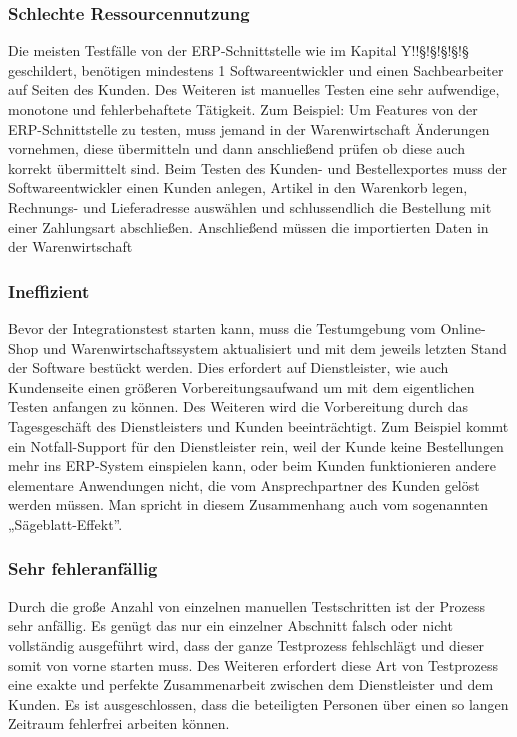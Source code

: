 \subsubsection{Schlechte Ressourcennutzung}%
Die meisten Testfälle von der ERP-Schnittstelle wie im Kapital Y!!§!§!§!§!§ geschildert, benötigen mindestens 1 Softwareentwickler und einen Sachbearbeiter auf Seiten des Kunden. Des Weiteren ist manuelles Testen eine sehr aufwendige, monotone und fehlerbehaftete
Tätigkeit. Zum Beispiel: Um Features von der ERP-Schnittstelle zu testen, muss jemand in der Warenwirtschaft Änderungen vornehmen, diese übermitteln und dann anschließend prüfen ob diese auch korrekt übermittelt sind. Beim Testen des Kunden- und Bestellexportes muss der Softwareentwickler einen Kunden anlegen, Artikel in den Warenkorb legen, Rechnungs- und Lieferadresse auswählen und schlussendlich die Bestellung mit einer Zahlungsart abschließen. Anschließend müssen die importierten Daten in der Warenwirtschaft%

\subsubsection{Ineffizient}
Bevor der Integrationstest starten kann, muss die Testumgebung vom Online-Shop und Warenwirtschaftssystem aktualisiert und mit dem jeweils letzten Stand der Software bestückt werden. Dies erfordert auf Dienstleister, wie auch Kundenseite einen größeren 
Vorbereitungsaufwand um mit dem eigentlichen Testen anfangen zu können. Des Weiteren wird die Vorbereitung durch das Tagesgeschäft des Dienstleisters und Kunden beeinträchtigt. Zum Beispiel kommt ein Notfall-Support für den Dienstleister rein, weil der Kunde keine Bestellungen mehr ins ERP-System einspielen kann, oder beim Kunden funktionieren andere elementare Anwendungen nicht, die vom Ansprechpartner des Kunden gelöst werden müssen. Man spricht in diesem Zusammenhang auch vom sogenannten „Sägeblatt-Effekt”.


\subsubsection{Sehr fehleranfällig}
Durch die große Anzahl von einzelnen manuellen Testschritten ist der Prozess sehr anfällig. Es genügt das nur ein einzelner Abschnitt falsch oder nicht vollständig ausgeführt wird, dass der ganze Testprozess fehlschlägt und dieser somit von vorne starten muss. Des Weiteren erfordert diese Art von Testprozess eine exakte und perfekte Zusammenarbeit zwischen dem Dienstleister und dem Kunden. Es ist ausgeschlossen, dass die beteiligten Personen über einen so langen Zeitraum fehlerfrei arbeiten können.

